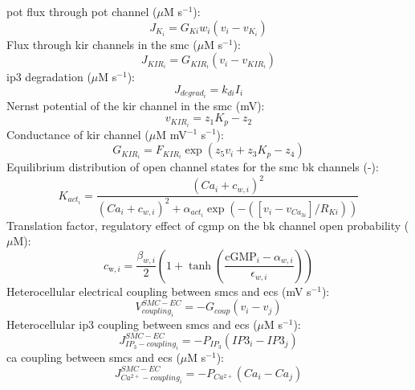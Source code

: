 \documentclass[11pt]{elsarticle}
\newcommand{\mus}{$\mu$M s$^{-1}$\xspace}
\newcommand{\uM}{$\mu$M\xspace}
\newcommand{\n}{$^{-1}$\xspace}
\newcommand{\psec}{s$^{-1}$\xspace}
\newcommand{\pot}{\gls{pot}\xspace}
\newcommand{\ca}{\gls{ca}\xspace}
\newcommand{\ip}{\gls{ip3}\xspace}
\begin{document}
\pot flux through \pot channel (\mus):
\begin{equation} \label{eq:JKi}
J_{K_{i}}= G_{Ki} w_{i} \left(  v_{i} - v_{K_i}  \right) 
\end{equation}
%
Flux through \gls{kir} channels in the \gls{smc} (\mus): 
\begin{equation} \label{eq:JKIRi}
J_{KIR_{i}} =  G_{KIR_{i}}( v_{i} - v_{KIR_{i}})
\end{equation}
%
\ip degradation (\mus): 
\begin{equation} \label{eq:Jdegradi}
J_{degrad_{i}}= k_{di}I_{i}
\end{equation}
%
Nernst potential of the \gls{kir} channel in the \gls{smc} (mV):
\begin{equation}\label{eq:vKIR}
v_{KIR_i} = z_1 K_p-z_2
\end{equation}
%
Conductance of \gls{kir} channel (\uM mV\n \psec):
\begin{equation}\label{eq:gKIR}
G_{KIR_i} = F_{KIR_{i}} \exp(z_5 v_i +z_3 K_p - z_4)
\end{equation}
%
Equilibrium distribution of open channel states for the \gls{smc} \gls{bk} channels (-):
\begin{equation} \label{eq:Kacti}
K_{act_{i}} = \frac{  \left( Ca_i + c_{w,i}\right)^{2}}    {\left( Ca_i + c_{w,i} \right)^{2}    + \alpha_{act_i} \exp( -\left(   \left[ v_{i}-v_{Ca_{3i}}\right] /R_{Ki}   \right) )      }
\end{equation}
%
Translation factor, regulatory effect of \gls{cgmp} on the \gls{bk} channel open probability (\uM): 
\begin{equation} 
c_{\text{w},i} = \frac{\beta_{w,i}}{2} (1 + \tanh\left( \frac{\text{cGMP}_i - \alpha_{w,i}}{\epsilon_{w,i}}\right) )
\end{equation}
%
Heterocellular electrical coupling between \glspl{smc} and \glspl{ec} (mV \psec):
\begin{equation} \label{eq:Vcouplingi}
V_{coupling_{i}}^{SMC-EC}= -G_{coup}(v_{i}-v_{j})
\end{equation}
%
Heterocellular \ip coupling between \glspl{smc} and \glspl{ec} (\mus):
\begin{equation} \label{eq:JIP3couplingi}
J_{IP_{3}-coupling_{i}}^{SMC-EC}= -P_{IP_{3}}(IP3_{i}-IP3_{j})
\end{equation}
%
\ca coupling between \glspl{smc} and \glspl{ec} (\mus):
\begin{equation} \label{eq:JCAcouplingi}
J_{Ca^{2+}-coupling_{i}}^{SMC-EC}= -P_{Ca^{2+}}(Ca_i-Ca_j)
\end{equation}
\end{document}
